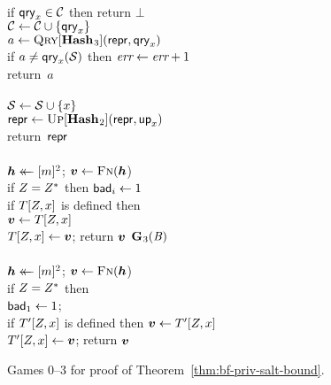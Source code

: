 \begin{figure}
{    \\[2pt]
      if $\mathsf{qry}_x \in \mathcal{C}$ then return $\bot$\\
      $\mathcal{C} \gets \mathcal{C} \cup \{\mathsf{qry}_x\}$\\
      $a \gets \textsc{Qry}[\mathbf{Hash}\hspace{0.5pt}_3](\mathsf{repr}, \mathsf{qry}_x)$\\
      if $a \neq \mathsf{qry}_x(\mathcal{S})$ then $\textit{err} \gets \textit{err} + 1$\\
      return~$a$
    \\[6pt]
    \\[2pt]
      $\mathcal{S} \gets \mathcal{S} \cup \{x\}$\\
      $\mathsf{repr} \gets \textsc{Up}[\mathbf{Hash}\hspace{0.5pt}_2](\mathsf{repr},\mathsf{up}_x)$\\
      return~$\mathsf{repr}$
    \\[6pt]
    \\[2pt]
      $\hh \getsr [m]^2$; $\vv \gets \fff(\hh$)\\
      if $Z = Z^*$ then $\mathsf{bad}_i \gets 1$\\
      if $T[Z,x]$ is defined then\\
      \tab $\vv \gets T[\salt,x]$\\
      $T[\salt,x] \gets \vv$;
      return $\vv$
  }
  {
    \underline{$\mathbf{G}\hspace{0.5pt}_3(\mathit{B})$}\\[2pt]
    \\[2pt]
      $\hh \getsr [m]^2$; $\vv \gets \fff(\hh$)\\
      if $Z = Z^*$ then\\
      \tab $\mathsf{bad}_1 \gets 1$; \\
      if $T'[Z,x]$ is defined then $\vv \gets T'[\salt,x]$\\
      $T'[\salt,x] \gets \vv$;
      return $\vv$
  }
  {
  }
  \caption{Games 0--3 for proof of Theorem~\ref{thm:bf-priv-salt-bound}.}
  \label{fig:bf-priv-salt-bound}
\end{figure}